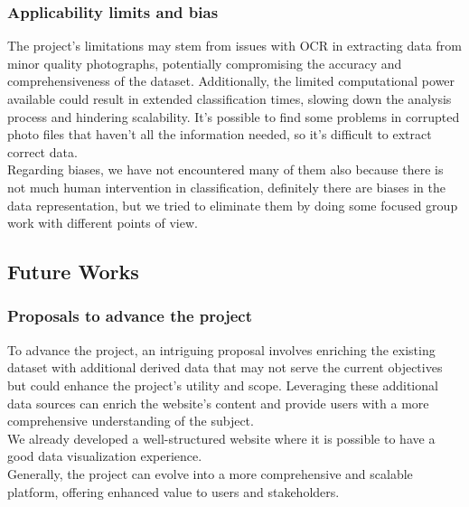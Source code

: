 \documentclass[12pt,a4paper,twoside]{article}
\begin{document}
\subsubsection{Applicability limits and bias}
The project's limitations may stem from issues with OCR in extracting data from minor quality photographs, potentially compromising the accuracy and comprehensiveness of the dataset. Additionally, the limited computational power available could result in extended classification times, slowing down the analysis process and hindering scalability. It's possible to find some problems in corrupted photo files that haven't all the information needed, so it's difficult to extract correct data.\\
Regarding biases, we have not encountered many of them also because there is not much human intervention in classification, definitely there are biases in the data representation, but we tried to eliminate them by doing some focused group work with different points of view.\\

\subsection{Future Works}
\subsubsection{Proposals to advance the project}
To advance the project, an intriguing proposal involves enriching the existing dataset with additional derived data that may not serve the current objectives but could enhance the project's utility and scope. Leveraging these additional data sources can enrich the website's content and provide users with a more comprehensive understanding of the subject.\\
We already developed a well-structured website where it is possible to have a good data visualization experience.\\
Generally, the project can evolve into a more comprehensive and scalable platform, offering enhanced value to users and stakeholders.
\end{document}
